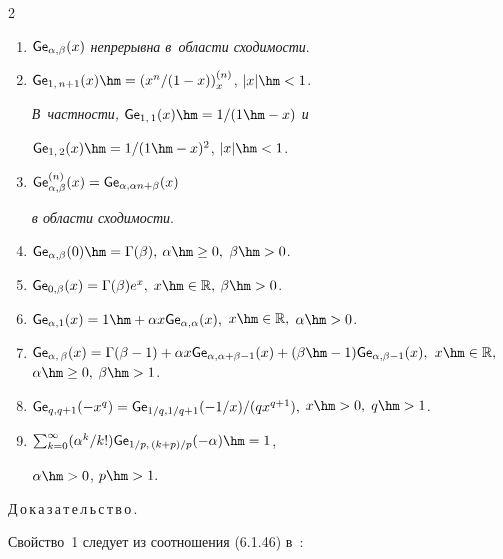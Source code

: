 \begin{multicols}{2}
\begin{enumerate}
{$\alpha=1$, $0\hm<\beta\hm<1$; сходится только 


в~точке  $x\hm = 0$ при} $\alpha\hm>1$, $\beta\hm>0$.


\item ${\sf Ge}_{\alpha, \beta}(x)$ \textit{непрерывна в~области сходимости}.


\item $\G_{1,\, n+1} (x) \hm= \left({x^n}/{(1-x)}\right)^{(n)}_x$, $|x|\hm<1$. 


\textit{В~частности, $\G_{1,\, 1} (x)\hm= {1/{(1\hm-x)}}$ и}


$\G_{1,\, 2} (x)\hm= {1/{(1\hm-x)^2}}$,  $|x|\hm<1$.


\item ${\sf Ge}^{(n)}_{\alpha, \beta} (x) = {\sf Ge}_{\alpha, \alpha n + \beta}(x)$ 


\textit{в области сходимости}.


\item $\G_{\alpha, \beta} (0)\hm=\Gamma(\beta),$ $\alpha\hm\ge0,$ $\beta\hm> 0$.


\item ${\sf Ge}_{0, \beta} (x)= \Gamma(\beta)e^{x},$ $x\hm\in\mathbb{R},$ $\beta\hm> 0$.


\item $\G_{\alpha, 1}(x)=1\hm+\alpha x\G_{\alpha, \alpha}(x),$ $x\hm\in


\mathbb{R},$ $\alpha\hm>0$.


\item $\G_{\alpha,\, \beta}(x)=\Gamma(\beta-1)+\alpha x \G_{\alpha,\alpha+\beta-1}(x)


+(\beta\hm-1)\G_{\alpha, \beta-1}(x),$ $x\hm\in\mathbb{R},$ $\alpha\hm\ge0,$ $\beta\hm>1$.


\item ${\sf Ge}_{q, q+1}(-x^q)={\sf Ge}_{1/q, 1/q+1 }(-{1/x})/{({qx^{q+1}})},$ $x\hm>0,$ $q\hm>1$.


\item $\sum\nolimits_{k=0}^\infty ({\alpha^k}/{k!}) \G_{1/p,\, (k+p)/p}(- \alpha)\hm= 1$, 


$\alpha\hm>0$, $p\hm>1.$


\end{enumerate}








\noindent


Д\,о\,к\,а\,з\,а\,т\,е\,л\,ь\,с\,т\,в\,о\,.\ \ 


Свойство~1 следует из соотношения (6.1.46) в~\cite{AbSt}:



\end{multicols}

